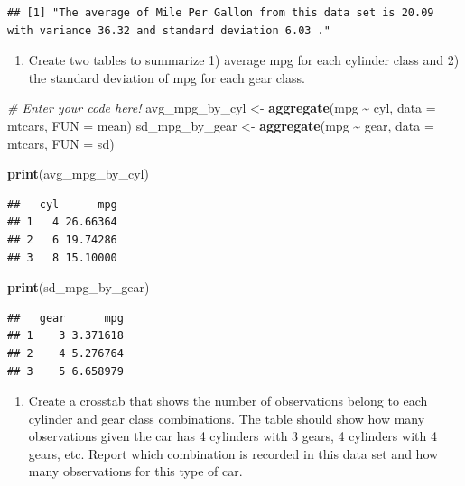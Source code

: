 \documentclass[
]{article}
\newenvironment{Shaded}{\begin{snugshade}}{\end{snugshade}}
\newcommand{\AttributeTok}[1]{\textcolor[rgb]{0.13,0.29,0.53}{#1}}
\newcommand{\CommentTok}[1]{\textcolor[rgb]{0.56,0.35,0.01}{\textit{#1}}}
\newcommand{\FunctionTok}[1]{\textcolor[rgb]{0.13,0.29,0.53}{\textbf{#1}}}
\newcommand{\NormalTok}[1]{#1}
\newcommand{\OtherTok}[1]{\textcolor[rgb]{0.56,0.35,0.01}{#1}}
\newcommand{\SpecialCharTok}[1]{\textcolor[rgb]{0.81,0.36,0.00}{\textbf{#1}}}
\providecommand{\tightlist}{%
  \setlength{\itemsep}{0pt}\setlength{\parskip}{0pt}}
\begin{document}
\begin{verbatim}
## [1] "The average of Mile Per Gallon from this data set is 20.09 with variance 36.32 and standard deviation 6.03 ."
\end{verbatim}

\begin{enumerate}
\def\labelenumi{\alph{enumi}.}
\setcounter{enumi}{3}
\tightlist
\item
  Create two tables to summarize 1) average mpg for each cylinder class
  and 2) the standard deviation of mpg for each gear class.
\end{enumerate}

\begin{Shaded}
\begin{Highlighting}[]
\CommentTok{\# Enter your code here!}
\NormalTok{avg\_mpg\_by\_cyl }\OtherTok{\textless{}{-}} \FunctionTok{aggregate}\NormalTok{(mpg }\SpecialCharTok{\textasciitilde{}}\NormalTok{ cyl, }\AttributeTok{data =}\NormalTok{ mtcars, }\AttributeTok{FUN =}\NormalTok{ mean)}
\NormalTok{sd\_mpg\_by\_gear }\OtherTok{\textless{}{-}} \FunctionTok{aggregate}\NormalTok{(mpg }\SpecialCharTok{\textasciitilde{}}\NormalTok{ gear, }\AttributeTok{data =}\NormalTok{ mtcars, }\AttributeTok{FUN =}\NormalTok{ sd)}

\FunctionTok{print}\NormalTok{(avg\_mpg\_by\_cyl)}
\end{Highlighting}
\end{Shaded}

\begin{verbatim}
##   cyl      mpg
## 1   4 26.66364
## 2   6 19.74286
## 3   8 15.10000
\end{verbatim}

\begin{Shaded}
\begin{Highlighting}[]
\FunctionTok{print}\NormalTok{(sd\_mpg\_by\_gear)}
\end{Highlighting}
\end{Shaded}

\begin{verbatim}
##   gear      mpg
## 1    3 3.371618
## 2    4 5.276764
## 3    5 6.658979
\end{verbatim}

\begin{enumerate}
\def\labelenumi{\alph{enumi}.}
\setcounter{enumi}{4}
\tightlist
\item
  Create a crosstab that shows the number of observations belong to each
  cylinder and gear class combinations. The table should show how many
  observations given the car has 4 cylinders with 3 gears, 4 cylinders
  with 4 gears, etc. Report which combination is recorded in this data
  set and how many observations for this type of car.
\end{enumerate}
\end{document}
